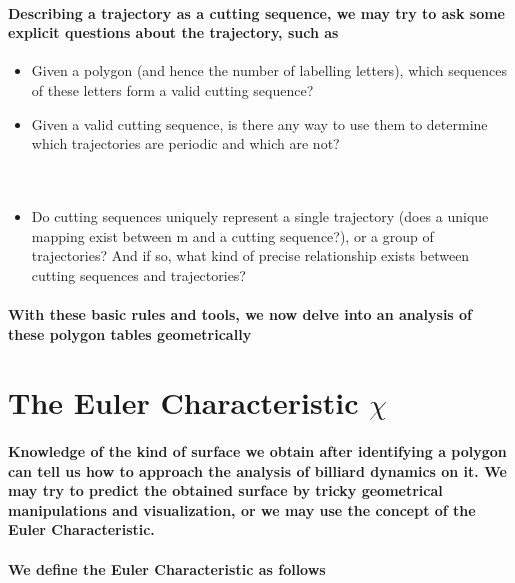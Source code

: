 \documentclass{report}
\begin{document}
\paragraph{Describing a trajectory as a cutting sequence, we may try to ask some explicit questions about the trajectory, such as}

\begin{itemize}

\item Given a polygon (and hence the number of labelling letters), which sequences of these letters form a valid cutting sequence?

\item Given a valid cutting sequence, is there any way to use them to determine which trajectories are periodic and which are not?\\ \\ \\

\item Do cutting sequences uniquely represent a single trajectory (does a unique mapping exist between m and a cutting sequence?), or a group of trajectories? And if so, what kind of precise relationship exists between cutting sequences and trajectories?

\end{itemize}

\paragraph{With these basic rules and tools, we now delve into an analysis of these polygon tables geometrically}

\section{The Euler Characteristic $\chi$}

\paragraph{Knowledge of the kind of surface we obtain after identifying a polygon can tell us how to approach the analysis of billiard dynamics on it. We may try to predict the obtained surface by tricky geometrical manipulations and visualization, or we may use the concept of the Euler Characteristic.}

\paragraph{We define the Euler Characteristic as follows}
\end{document}
